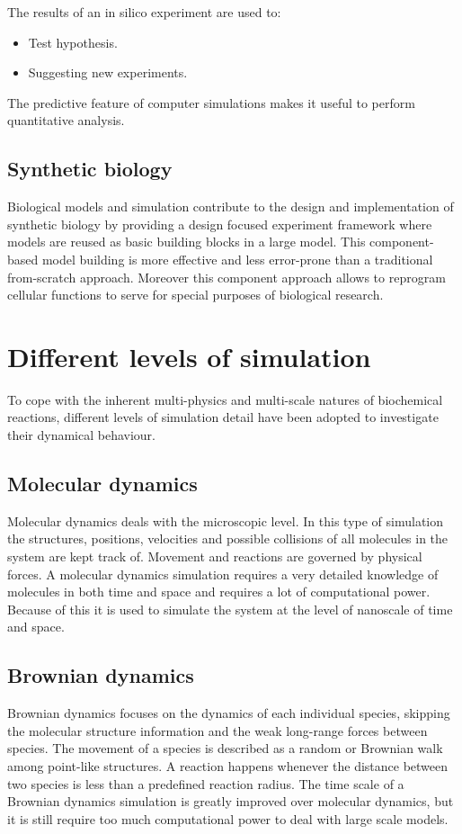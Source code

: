     The results of an in silico experiment are used to:

    \begin{multicols}{2}
      \begin{itemize}
        \item Test hypothesis.
        \item Suggesting new experiments.
      \end{itemize}
    \end{multicols}

    The predictive feature of computer simulations makes it useful to perform quantitative analysis.

  \subsection{Synthetic biology}
  Biological models and simulation contribute to the design and implementation of synthetic biology by providing a design focused experiment framework where models are reused as basic building blocks in a large model.
  This component-based model building is more effective and less error-prone than a traditional from-scratch approach.
  Moreover this component approach allows to reprogram cellular functions to serve for special purposes of biological research.

\section{Different levels of simulation}
To cope with the inherent multi-physics and multi-scale natures of biochemical reactions, different levels of simulation detail have been adopted to investigate their dynamical behaviour.

  \subsection{Molecular dynamics}
  Molecular dynamics deals with the microscopic level.
  In this type of simulation the structures, positions, velocities and possible collisions of all molecules in the system are kept track of.
  Movement and reactions are governed by physical forces.
  A molecular dynamics simulation requires a very detailed knowledge of molecules in both time and space and requires a lot of computational power.
  Because of this it is used to simulate the system at the level of nanoscale of time and space.

  \subsection{Brownian dynamics}
  Brownian dynamics focuses on the dynamics of each individual species, skipping the molecular structure information and the weak long-range forces between species.
  The movement of a species is described as a random or Brownian walk among point-like structures.
  A reaction happens whenever the distance between two species is less than a predefined reaction radius.
  The time scale of a Brownian dynamics simulation is greatly improved over molecular dynamics, but it is still require too much computational power to deal with large scale models.

